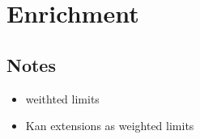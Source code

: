 \documentclass[DaoFP]{subfiles}
\begin{document}
\setcounter{chapter}{19}

\chapter{Enrichment}

\section{Notes}

\begin{itemize}
\item weithted limits

\item Kan extensions as weighted limits
\end{itemize}
\end{document}
